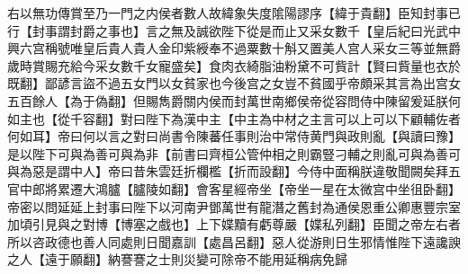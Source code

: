 右以無功傳賞至乃一門之内侯者數人故緯象失度隂陽謬序【緯于貴翻】臣知封事已行【封事謂封爵之事也】言之無及誠欲陛下從是而止又采女數千【皇后紀曰光武中興六宫稱號唯皇后貴人貴人金印紫綬奉不過粟數十斛又置美人宫人采女三等並無爵歲時賞賜充給今采女數千女寵盛矣】食肉衣綺脂油粉黛不可貲計【賢曰貲量也衣於既翻】鄙諺言盜不過五女門以女貧家也今後宫之女豈不貧國乎帝頗采其言為出宫女五百餘人【為于偽翻】但賜雋爵關内侯而封萬世南鄉侯帝從容問侍中陳留爰延朕何如主也【從千容翻】對曰陛下為漢中主【中主為中材之主言可以上可以下顧輔佐者何如耳】帝曰何以言之對曰尚書令陳蕃任事則治中常侍黄門與政則亂【與讀曰豫】是以陛下可與為善可與為非【前書曰齊桓公管仲相之則霸豎刁輔之則亂可與為善可與為惡是謂中人】帝曰昔朱雲廷折欄檻【折而設翻】今侍中面稱朕違敬聞闕矣拜五官中郎將累遷大鴻臚【臚陵如翻】會客星經帝坐【帝坐一星在太微宫中坐徂卧翻】帝密以問延延上封事曰陛下以河南尹鄧萬世有龍潛之舊封為通侯恩重公卿惠豐宗室加頃引見與之對博【博塞之戲也】上下媟黷有虧尊嚴【媟私列翻】臣聞之帝左右者所以咨政德也善人同處則日聞嘉訓【處昌呂翻】惡人從游則日生邪情惟陛下遠讒諛之人【遠于願翻】納謇謇之士則災變可除帝不能用延稱病免歸


